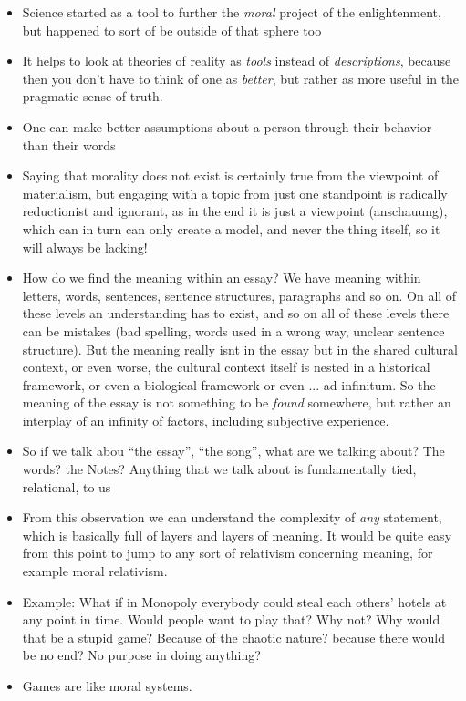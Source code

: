 \documentclass[emulatestandardclasses]{scrartcl}
\begin{document}
\begin{itemize}
  \item Science started as a tool to further the \emph{moral} project of the enlightenment, but happened to sort of be outside of that sphere too
  \item It helps to look at theories of reality as \emph{tools} instead of \emph{descriptions}, because then you don't have to think of one as \emph{better}, but rather as more useful in the pragmatic sense of truth.
  \item One can make better assumptions about a person through their behavior than their words
  \item Saying that morality does not exist is certainly true from the viewpoint of materialism, but engaging with a topic from just one standpoint is radically reductionist and ignorant, as in the end it is just a viewpoint (anschauung), which can in turn can only create a model, and never the thing itself, so it will always be lacking!
  \item How do we find the meaning within an essay? We have meaning within letters, words, sentences, sentence structures, paragraphs and so on. On all of these levels an understanding has to exist, and so on all of these levels there can be mistakes (bad spelling, words used in a wrong way, unclear sentence structure). But the meaning really isnt in the essay but in the shared cultural context, or even worse, the cultural context itself is nested in a historical framework, or even a biological framework or even ... ad infinitum. So the meaning of the essay is not something to be \emph{found} somewhere, but rather an interplay of an infinity of factors, including subjective experience.
  \item So if we talk abou "`the essay"', "`the song"', what are we talking about? The words? the Notes? Anything that we talk about is fundamentally tied, relational, to us
  \item From this observation we can understand the complexity of \emph{any} statement, which is basically full of layers and layers of meaning. It would be quite easy from this point to jump to any sort of relativism concerning meaning, for example moral relativism.
  \item Example: What if in Monopoly everybody could steal each others' hotels at any point in time. Would people want to play that? Why not? Why would that be a stupid game? Because of the chaotic nature? because there would be no end? No purpose in doing anything?
  \item Games are like moral systems.
\end{itemize}
\end{document}
